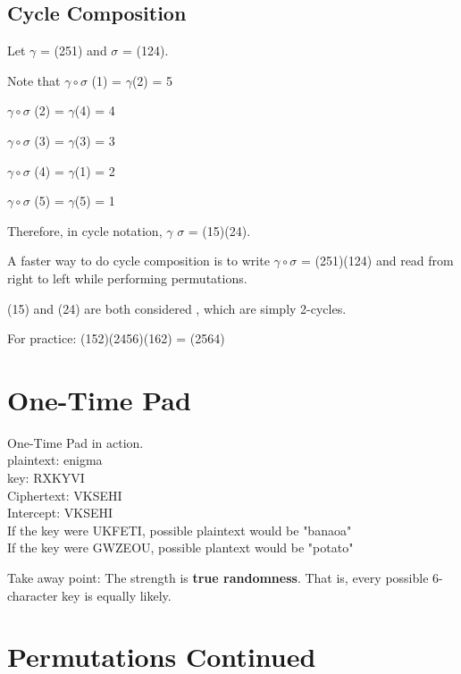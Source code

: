 \subsection{Cycle Composition}
\par Let $\gamma$ = (251) and $\sigma$ = (124). \par
Note that $\gamma\circ\sigma$ (1) = $\gamma$(2) = 5 \par $\gamma\circ\sigma$ (2) = $\gamma$(4) = 4 \par $\gamma\circ\sigma$ (3) = $\gamma$(3) = 3 \par $\gamma\circ\sigma$ (4) = $\gamma$(1) = 2 \par $\gamma\circ\sigma$ (5) = $\gamma$(5) = 1 \par Therefore, in cycle notation, $\gamma$ $\sigma$ = (15)(24). \par A faster way to do cycle composition is to write $\gamma\circ\sigma$ = (251)(124) and read from right to left while performing permutations. \par \begin{definition} (15) and (24) are both considered , which are simply 2-cycles. \end{definition}  \par \begin{example}For practice: (152)(2456)(162) = (2564) \end{example}

\section{One-Time Pad}
\begin{example}One-Time Pad in action. \\ 
plaintext: enigma \\
key: RXKYVI \\
Ciphertext: VKSEHI \\
Intercept: VKSEHI \\
If the key were UKFETI, possible plaintext would be "banaoa" \\
If the key were GWZEOU, possible plantext would be "potato" \end{example} 
Take away point: The strength is \textbf{true randomness}.  That is, every possible 6-character key is equally likely.
\section{Permutations Continued} \par 

